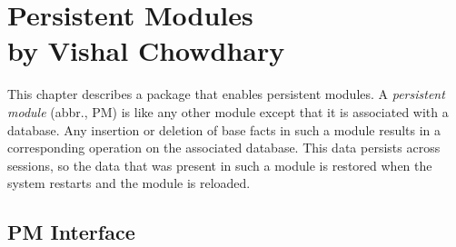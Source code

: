 \chapter[Persistent Modules]{Persistent Modules\\{by Vishal Chowdhary}}



\newcommand{\psm}{\mbox{PM}\xspace}

This chapter describes a \FLSYSTEM package that enables persistent modules.  A
\emph{persistent module} (abbr., \psm) is like any other \FLSYSTEM module
except that it is associated with a database. Any insertion or deletion of
base facts in such a module results in a corresponding operation on the
associated database. This data persists across \FLSYSTEM sessions, so the data
that was present in such a module is restored when the system restarts and
the module is reloaded.
  

\section{PM Interface}


